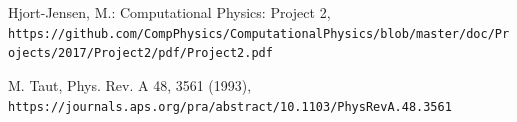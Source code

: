 \documentclass{article}
\begin{document}
\begin{thebibliography}{1}
Hjort-Jensen, M.: Computational Physics: Project 2,
\\\texttt{https://github.com/CompPhysics/ComputationalPhysics/blob/master/doc/Projects/2017/Project2/pdf/Project2.pdf}


M. Taut, Phys. Rev. A 48, 3561 (1993),
\\\texttt{https://journals.aps.org/pra/abstract/10.1103/PhysRevA.48.3561}
\end{thebibliography}
\end{document}
